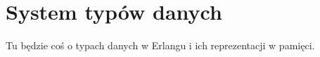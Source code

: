 \section{System typów danych}
\label{sec:erlangTypy}

Tu będzie coś o typach danych w Erlangu i ich reprezentacji w pamięci.